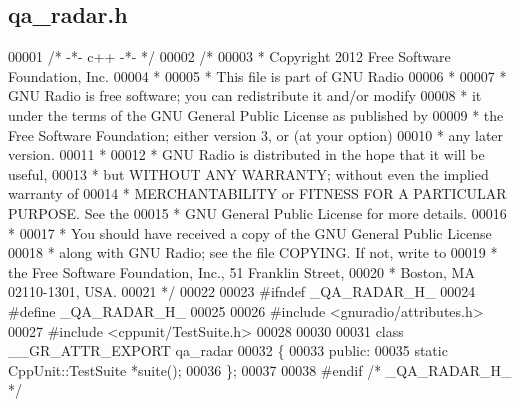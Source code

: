 \subsection{qa\+\_\+radar.\+h}
\label{qa__radar_8h_source}

\begin{DoxyCode}
00001 \textcolor{comment}{/* -*- c++ -*- */}
00002 \textcolor{comment}{/*}
00003 \textcolor{comment}{ * Copyright 2012 Free Software Foundation, Inc.}
00004 \textcolor{comment}{ *}
00005 \textcolor{comment}{ * This file is part of GNU Radio}
00006 \textcolor{comment}{ *}
00007 \textcolor{comment}{ * GNU Radio is free software; you can redistribute it and/or modify}
00008 \textcolor{comment}{ * it under the terms of the GNU General Public License as published by}
00009 \textcolor{comment}{ * the Free Software Foundation; either version 3, or (at your option)}
00010 \textcolor{comment}{ * any later version.}
00011 \textcolor{comment}{ *}
00012 \textcolor{comment}{ * GNU Radio is distributed in the hope that it will be useful,}
00013 \textcolor{comment}{ * but WITHOUT ANY WARRANTY; without even the implied warranty of}
00014 \textcolor{comment}{ * MERCHANTABILITY or FITNESS FOR A PARTICULAR PURPOSE.  See the}
00015 \textcolor{comment}{ * GNU General Public License for more details.}
00016 \textcolor{comment}{ *}
00017 \textcolor{comment}{ * You should have received a copy of the GNU General Public License}
00018 \textcolor{comment}{ * along with GNU Radio; see the file COPYING.  If not, write to}
00019 \textcolor{comment}{ * the Free Software Foundation, Inc., 51 Franklin Street,}
00020 \textcolor{comment}{ * Boston, MA 02110-1301, USA.}
00021 \textcolor{comment}{ */}
00022 
00023 \textcolor{preprocessor}{#ifndef \_QA\_RADAR\_H\_}
00024 \textcolor{preprocessor}{#define \_QA\_RADAR\_H\_}
00025 
00026 \textcolor{preprocessor}{#include <gnuradio/attributes.h>}
00027 \textcolor{preprocessor}{#include <cppunit/TestSuite.h>}
00028 
00030 
00031 \textcolor{keyword}{class }\_\_GR\_ATTR\_EXPORT qa_radar
00032 \{
00033  \textcolor{keyword}{public}:
00035   \textcolor{keyword}{static} CppUnit::TestSuite *suite();
00036 \};
00037 
00038 \textcolor{preprocessor}{#endif }\textcolor{comment}{/* \_QA\_RADAR\_H\_ */}\textcolor{preprocessor}{}
\end{DoxyCode}
